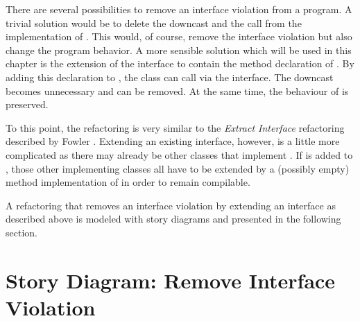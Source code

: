 There are several possibilities to remove an interface violation from a program. A trivial solution would be to delete the downcast and the call from the implementation of . This would, of course, remove the interface violation but also change the program behavior. A more sensible solution which will be used in this chapter is the extension of the interface  to contain the method declaration of . By adding this declaration to , the class  can call  via the interface. The downcast becomes unnecessary and can be removed. At the same time, the behaviour of  is preserved.

To this point, the refactoring is very similar to the \emph{Extract Interface} refactoring described by Fowler \cite{Fow99}. Extending an existing interface, however, is a little more complicated as there may already be other classes that implement . If  is added to , those other implementing classes all have to be extended by a (possibly empty) method implementation of  in order to remain compilable.

A refactoring that removes an interface violation by extending an interface as described above is modeled with story diagrams and presented in the following section.

\section{Story Diagram: Remove Interface Violation}

